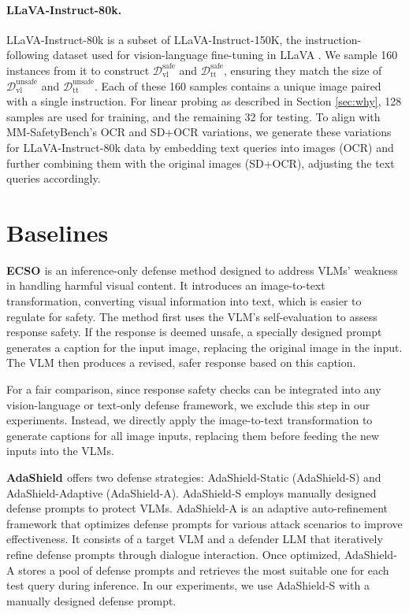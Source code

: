 \paragraph{LLaVA-Instruct-80k.} 

LLaVA-Instruct-80k is a subset of LLaVA-Instruct-150K, the instruction-following dataset used for vision-language fine-tuning in LLaVA \cite{liu2024visual}. We sample 160 instances from it to construct $\mathcal{D}^\text{safe}_\text{vl}$ and  $\mathcal{D}^\text{safe}_\text{tt}$, ensuring they match the size of $\mathcal{D}^\text{unsafe}_\text{vl}$ and  $\mathcal{D}^\text{unsafe}_\text{tt}$. Each of these 160 samples contains a unique image paired with a single instruction. For linear probing as described in Section \ref{sec:why}, 128 samples are used for training, and the remaining 32 for testing. To align with MM-SafetyBench’s OCR and SD+OCR variations, we generate these variations for LLaVA-Instruct-80k data by embedding text queries into images (OCR) and further combining them with the original images (SD+OCR), adjusting the text queries accordingly.



\section{Baselines} \label{appendix-baselines}

\textbf{ECSO \cite{gou2025eyes}} is an inference-only defense method designed to address VLMs' weakness in handling harmful visual content. It introduces an image-to-text transformation, converting visual information into text, which is easier to regulate for safety. The method first uses the VLM’s self-evaluation to assess response safety. If the response is deemed unsafe, a specially designed prompt generates a caption for the input image, replacing the original image in the input. The VLM then produces a revised, safer response based on this caption.

For a fair comparison, since response safety checks can be integrated into any vision-language or text-only defense framework, we exclude this step in our experiments. Instead, we directly apply the image-to-text transformation to generate captions for all image inputs, replacing them before feeding the new inputs into the VLMs.


\textbf{AdaShield \cite{wang2024adashield}} offers two defense strategies: AdaShield-Static (AdaShield-S) and AdaShield-Adaptive (AdaShield-A). AdaShield-S employs manually designed defense prompts to protect VLMs. AdaShield-A is an adaptive auto-refinement framework that optimizes defense prompts for various attack scenarios to improve effectiveness. It consists of a target VLM and a defender LLM that iteratively refine defense prompts through dialogue interaction. Once optimized, AdaShield-A stores a pool of defense prompts and retrieves the most suitable one for each test query during inference.  In our experiments, we use AdaShield-S with a manually designed defense prompt.


